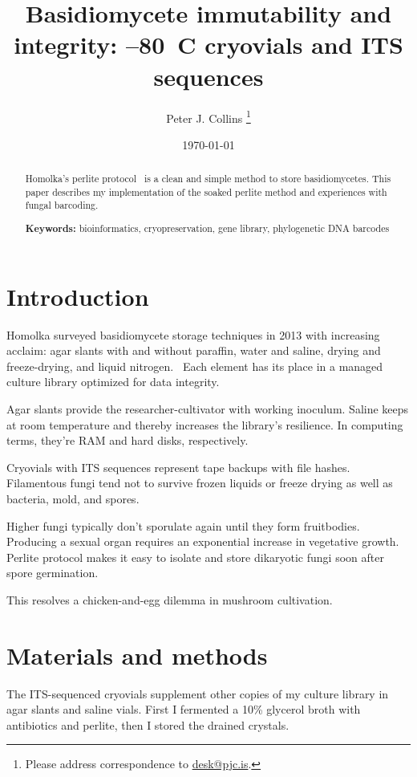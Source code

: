 \documentclass{article}
\title{Basidiomycete immutability and integrity: --80~\textdegree C cryovials and ITS sequences}
\author{Peter J. Collins
	\footnote{Please address correspondence to
	\href{mailto:desk@pjc.is}{desk@pjc.is}.}}
\date{\today}
\begin{document}
	\frenchspacing
	\maketitle


\begin{abstract}

Homolka's perlite protocol~\cite{homolka2001, homolka2006} is a clean and simple method to store basidiomycetes.
This paper describes my implementation of the soaked perlite method and experiences with fungal barcoding.

\textbf{Keywords:}
	bioinformatics,
	cryopreservation,
	gene library,
	phylogenetic DNA barcodes

\end{abstract}


\section{Introduction}

Homolka surveyed basidiomycete storage techniques in 2013 with increasing acclaim: agar slants with and without paraffin, water and saline, drying and freeze-drying, and liquid nitrogen.~\cite{homolka2014}
Each element has its place in a managed culture library optimized for data integrity.

Agar slants provide the researcher-cultivator with working inoculum.
Saline keeps at room temperature and thereby increases the library's resilience.
In computing terms, they're RAM and hard disks, respectively.

Cryovials with ITS sequences represent tape backups with file hashes.
Filamentous fungi tend not to survive frozen liquids or freeze drying as well as bacteria, mold, and spores.

Higher fungi typically don't sporulate again until they form fruitbodies.
Producing a sexual organ requires an exponential increase in vegetative growth.
Perlite protocol makes it easy to isolate and store dikaryotic fungi soon after spore germination.

This resolves a chicken-and-egg dilemma in mushroom cultivation.


\section{Materials and methods}

The ITS-sequenced cryovials supplement other copies of my culture library in agar slants and saline vials.
First I fermented a 10\% glycerol broth with antibiotics and perlite, then I stored the drained crystals.
\end{document}
